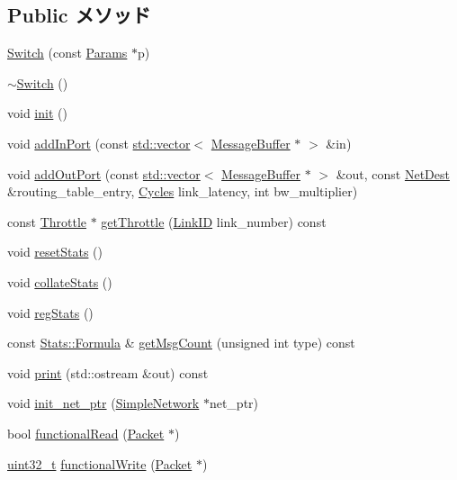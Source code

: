 \subsection*{Public メソッド}
\begin{DoxyCompactItemize}
\item 
\hyperlink{classSwitch_a7427cd58b757e55fe72f45e0c3f32faa}{Switch} (const \hyperlink{classSwitch_a07c03790510d4a31198bb5deef53da38}{Params} $\ast$p)
\item 
\hyperlink{classSwitch_a0b78f1267b509f8f56be95957aadce72}{$\sim$Switch} ()
\item 
void \hyperlink{classSwitch_a02fd73d861ef2e4aabb38c0c9ff82947}{init} ()
\item 
void \hyperlink{classSwitch_a1c4c43d5cc554f870b4c7a485fb25c7e}{addInPort} (const \hyperlink{classstd_1_1vector}{std::vector}$<$ \hyperlink{classMessageBuffer}{MessageBuffer} $\ast$ $>$ \&in)
\item 
void \hyperlink{classSwitch_ac0f1adb20e837d8c920d4b5aea6785a2}{addOutPort} (const \hyperlink{classstd_1_1vector}{std::vector}$<$ \hyperlink{classMessageBuffer}{MessageBuffer} $\ast$ $>$ \&out, const \hyperlink{classNetDest}{NetDest} \&routing\_\-table\_\-entry, \hyperlink{classCycles}{Cycles} link\_\-latency, int bw\_\-multiplier)
\item 
const \hyperlink{classThrottle}{Throttle} $\ast$ \hyperlink{classSwitch_afd8e00a7915149693164e75dfa80a2b2}{getThrottle} (\hyperlink{TypeDefines_8hh_ab5106a4c9f29d7d11860745608da944d}{LinkID} link\_\-number) const 
\item 
void \hyperlink{classSwitch_a65880e61108132689a1bd769b9187fb7}{resetStats} ()
\item 
void \hyperlink{classSwitch_a208669cbc0bb1d52565956ca8c690c55}{collateStats} ()
\item 
void \hyperlink{classSwitch_a4dc637449366fcdfc4e764cdf12d9b11}{regStats} ()
\item 
const \hyperlink{classStats_1_1Formula}{Stats::Formula} \& \hyperlink{classSwitch_a0dc269718320917d8da80fe3d5275d90}{getMsgCount} (unsigned int type) const 
\item 
void \hyperlink{classSwitch_ac55fe386a101fbae38c716067c9966a0}{print} (std::ostream \&out) const 
\item 
void \hyperlink{classSwitch_aa5fa44fb9951e0d6308b8dd146a10dfa}{init\_\-net\_\-ptr} (\hyperlink{classSimpleNetwork}{SimpleNetwork} $\ast$net\_\-ptr)
\item 
bool \hyperlink{classSwitch_a6db56c593ee28a561c47e75a859300dd}{functionalRead} (\hyperlink{classPacket}{Packet} $\ast$)
\item 
\hyperlink{Type_8hh_a435d1572bf3f880d55459d9805097f62}{uint32\_\-t} \hyperlink{classSwitch_aba9037f662122b5f2e85647d35670e5c}{functionalWrite} (\hyperlink{classPacket}{Packet} $\ast$)
\end{DoxyCompactItemize}
